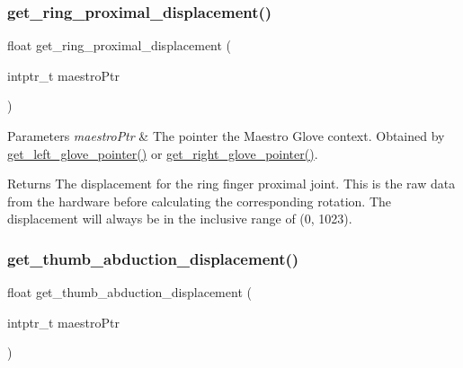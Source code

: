 \subsubsection{\texorpdfstring{get\+\_\+ring\+\_\+proximal\+\_\+displacement()}{get\_ring\_proximal\_displacement()}}
{\footnotesize\ttfamily float get\+\_\+ring\+\_\+proximal\+\_\+displacement (\begin{DoxyParamCaption}\item[{intptr\+\_\+t}]{maestro\+Ptr }\end{DoxyParamCaption})}


\begin{DoxyParams}{Parameters}
{\em maestro\+Ptr} & The pointer the Maestro Glove context. Obtained by \hyperlink{group__glove_management_ga63ce3c99d4a8b8db851b22af9185764e}{get\+\_\+left\+\_\+glove\+\_\+pointer()} or \hyperlink{group__glove_management_ga9b8fd9d91aeac3f8da50f7a7eba0c32b}{get\+\_\+right\+\_\+glove\+\_\+pointer()}. \\
\hline
\end{DoxyParams}
\begin{DoxyReturn}{Returns}
The displacement for the ring finger proximal joint. This is the raw data from the hardware before calculating the corresponding rotation. The displacement will always be in the inclusive range of (0, 1023). 
\end{DoxyReturn}
\mbox{\label{group__displacement_access_gaed15e3a23d0b98f46f78d7dadca62668}} 
\subsubsection{\texorpdfstring{get\+\_\+thumb\+\_\+abduction\+\_\+displacement()}{get\_thumb\_abduction\_displacement()}}
{\footnotesize\ttfamily float get\+\_\+thumb\+\_\+abduction\+\_\+displacement (\begin{DoxyParamCaption}\item[{intptr\+\_\+t}]{maestro\+Ptr }\end{DoxyParamCaption})}


